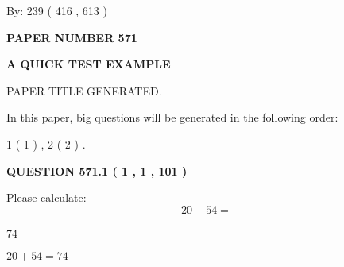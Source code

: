 \documentclass[12pt]{article}
\begin{document}
   
\hspace{1.0in} By: 
 239 ( 416 ,  613 )
   
   
   
   
\newpage 
\setcounter{page}{ 
   571001 } 
   
   
   
   
 {\textbf{ \Large{ PAPER NUMBER  571  }}}
   
   
\vspace{0.2in}
   
   
   
   
   
   
   
   
 \vspace{0.2in}
{\LARGE {\textbf{ A QUICK TEST EXAMPLE}}}
   
   
 PAPER TITLE GENERATED.
   
   
   
\vspace{0.2in}
   
In this paper, big questions will be generated in the following order: 
   
   
   1 ( 1 )
 ,
   2 ( 2 )
 .
  
\vspace{0.2in}
  
{\textbf{\Large{QUESTION
571.1 
 ( 1 , 1 , 101 )
}}}
  
  
 
Please calculate:
\begin{equation}
20 +  %
54 = \nonumber
\end{equation}
 
 
 
\noindent{}
 
 

74
 
 
\noindent{}
 
 

 
 
 
\noindent{}
 
 

$ %
20 +  %
54=   %
74$
 
 
\noindent{}
 
\end{document}
